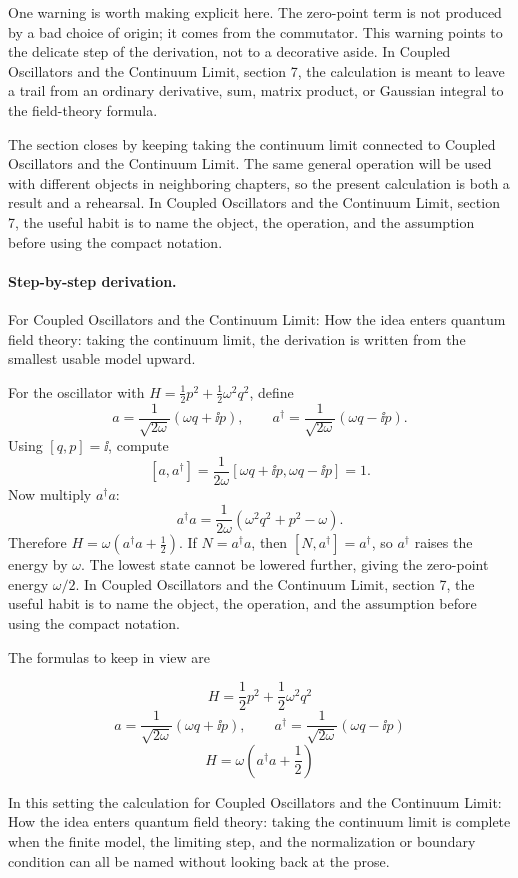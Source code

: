 One warning is worth making explicit here.  The zero-point term is not produced by a bad choice of origin; it comes from the commutator.  This warning points to the delicate step of the derivation, not to a decorative aside.  In Coupled Oscillators and the Continuum Limit, section 7, the calculation is meant to leave a trail from an ordinary derivative, sum, matrix product, or Gaussian integral to the field-theory formula.

The section closes by keeping taking the continuum limit connected to Coupled Oscillators and the Continuum Limit.  The same general operation will be used with different objects in neighboring chapters, so the present calculation is both a result and a rehearsal.  In Coupled Oscillators and the Continuum Limit, section 7, the useful habit is to name the object, the operation, and the assumption before using the compact notation.



\paragraph{Step-by-step derivation.}

For Coupled Oscillators and the Continuum Limit: How the idea enters quantum field theory: taking the continuum limit, the derivation is written from the smallest usable model upward.

For the oscillator with \(H=\frac12p^2+\frac12\omega^2q^2\), define
\[
  a=\frac{1}{\sqrt{2\omega}}(\omega q+\ii p),\qquad
  a^\dagger=\frac{1}{\sqrt{2\omega}}(\omega q-\ii p).
\]
Using \([q,p]=\ii\), compute
\[
  [a,a^\dagger]
  =
  \frac{1}{2\omega}[\omega q+\ii p,\omega q-\ii p]=1.
\]
Now multiply \(a^\dagger a\):
\[
  a^\dagger a=\frac{1}{2\omega}(\omega^2q^2+p^2-\omega).
\]
Therefore \(H=\omega(a^\dagger a+\frac12)\).  If \(N=a^\dagger a\), then \([N,a^\dagger]=a^\dagger\), so \(a^\dagger\) raises the energy by \(\omega\).  The lowest state cannot be lowered further, giving the zero-point energy \(\omega/2\).  In Coupled Oscillators and the Continuum Limit, section 7, the useful habit is to name the object, the operation, and the assumption before using the compact notation.

The formulas to keep in view are

\[
  H=\frac12p^2+\frac12\omega^2q^2
\]
\[
  a=\frac{1}{\sqrt{2\omega}}(\omega q+\ii p),\qquad a^\dagger=\frac{1}{\sqrt{2\omega}}(\omega q-\ii p)
\]
\[
  H=\omega\left(a^\dagger a+\frac12\right)
\]

In this setting the calculation for Coupled Oscillators and the Continuum Limit: How the idea enters quantum field theory: taking the continuum limit is complete when the finite model, the limiting step, and the normalization or boundary condition can all be named without looking back at the prose.




